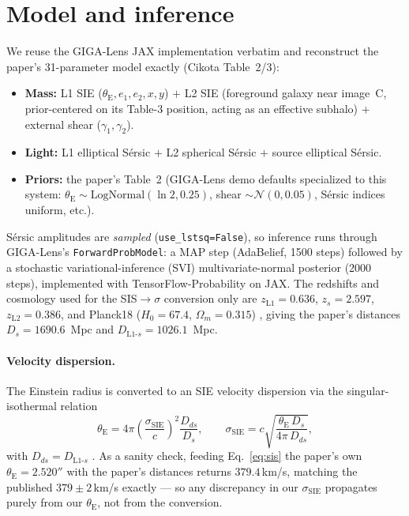 \documentclass[11pt,letterpaper]{article}
\newcommand{\thetaE}{\ensuremath{\theta_{\mathrm{E}}}}
\newcommand{\sigmaSIE}{\ensuremath{\sigma_{\mathrm{SIE}}}}
\renewcommand{\arcsec}{\ensuremath{''}}
\begin{document}
\section{Model and inference}

We reuse the GIGA-Lens \autocite{gu2022gigalens} JAX \autocite{jax2018}
implementation verbatim and reconstruct the paper's 31-parameter model
exactly (Cikota Table~2/3):
\begin{itemize}
\item \textbf{Mass:} L1 SIE ($\thetaE, e_1, e_2, x, y$) $+$ L2 SIE
      (foreground galaxy near image~C, prior-centered on its Table-3
      position, acting as an effective subhalo) $+$ external shear
      ($\gamma_1, \gamma_2$).
\item \textbf{Light:} L1 elliptical S\'ersic $+$ L2 spherical S\'ersic
      $+$ source elliptical S\'ersic.
\item \textbf{Priors:} the paper's Table~2 (GIGA-Lens demo defaults
      specialized to this system: $\thetaE \sim
      \mathrm{LogNormal}(\ln 2, 0.25)$, shear $\sim \mathcal{N}(0,
      0.05)$, S\'ersic indices uniform, etc.).
\end{itemize}
S\'ersic amplitudes are \emph{sampled} (\texttt{use\_lstsq=False}), so
inference runs through GIGA-Lens's \texttt{ForwardProbModel}: a MAP step
(AdaBelief, 1500 steps) followed by a stochastic variational-inference
(SVI) multivariate-normal posterior (2000 steps), implemented with
TensorFlow-Probability on JAX. The redshifts and cosmology used for the
SIS$\to\sigma$ conversion only are $z_{\mathrm{L1}}=0.636$,
$z_s=2.597$, $z_{\mathrm{L2}}=0.386$, and Planck18
($H_0=67.4$, $\Omega_m=0.315$) \autocite{planck2020params}, giving the
paper's distances $D_s=1690.6$~Mpc and $D_{\mathrm{L1}\text{-}s}=1026.1$~Mpc.

\paragraph{Velocity dispersion.} The Einstein radius is converted to an
SIE velocity dispersion via the singular-isothermal relation
\begin{equation}
\thetaE = 4\pi \left(\frac{\sigmaSIE}{c}\right)^2 \frac{D_{ds}}{D_s},
\qquad
\sigmaSIE = c\sqrt{\frac{\thetaE\,D_s}{4\pi\,D_{ds}}},
\label{eq:sis}
\end{equation}
with $D_{ds}=D_{\mathrm{L1}\text{-}s}$ \autocite{narayan1996bartelmann}.
As a sanity check, feeding Eq.~\eqref{eq:sis} the paper's own
$\thetaE = 2.520\arcsec$ with the paper's distances returns
$379.4\,$km/s, matching the published $379\pm2\,$km/s exactly --- so any
discrepancy in our $\sigmaSIE$ propagates purely from our $\thetaE$, not
from the conversion.
\end{document}
